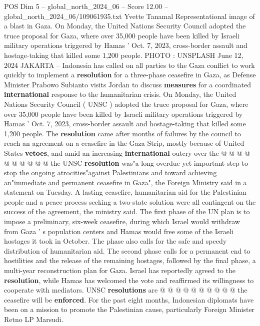 \begin{textsample}{POS Dim 5 – global\_north\_2024\_06 – Score 12.00 – global\_north\_2024\_06/109061935.txt}  \label{ex:f5_pos_378}
Yvette Tanamal Representational image of a blast in Gaza.
On Monday, the United Nations Security Council adopted the truce proposal for Gaza, where over 35,000 people have been killed by Israeli military operations triggered by Hamas ' Oct. 7, 2023, cross-border assault and hostage-taking that killed some 1,200 people.
PHOTO : UNSPLASH June 12, 2024 JAKARTA -- Indonesia has called on all parties to the Gaza conflict to work quickly to implement a \textbf{resolution} for a three-phase ceasefire in Gaza, as Defense Minister Prabowo Subianto visits Jordan to discuss \textbf{measures} for a coordinated \textbf{international} response to the humanitarian crisis.
On Monday, the United Nations Security Council ( UNSC ) adopted the truce proposal for Gaza, where over 35,000 people have been killed by Israeli military operations triggered by Hamas ' Oct. 7, 2023, cross-border assault and hostage-taking that killed some 1,200 people.
The \textbf{resolution} came after months of failures by the council to reach an agreement on a ceasefire in the Gaza Strip, mostly because of United States \textbf{vetoes}, and amid an increasing \textbf{international} outcry over the @ @ @ @ @ @ @ @ @ @ the UNSC \textbf{resolution} was"a long overdue yet important step to stop the ongoing atrocities"against Palestinians and toward achieving an"immediate and permanent ceasefire in Gaza", the Foreign Ministry said in a statement on Tuesday.
A lasting ceasefire, humanitarian aid for the Palestinian people and a peace process seeking a two-state solution were all contingent on the success of the agreement, the ministry said.
The first phase of the UN plan is to impose a preliminary, six-week ceasefire, during which Israel would withdraw from Gaza ' s population centers and Hamas would free some of the Israeli hostages it took in October.
The phase also calls for the safe and speedy distribution of humanitarian aid.
The second phase calls for a permanent end to hostilities and the release of the remaining hostages, followed by the final phase, a multi-year reconstruction plan for Gaza.
Israel has reportedly agreed to the \textbf{resolution}, while Hamas has welcomed the vote and reaffirmed its willingness to cooperate with mediators.
UNSC \textbf{resolutions} are @ @ @ @ @ @ @ @ @ @ the ceasefire will be \textbf{enforced}.
For the past eight months, Indonesian diplomats have been on a mission to promote the Palestinian cause, particularly Foreign Minister Retno LP Marsudi.

\end{textsample}
